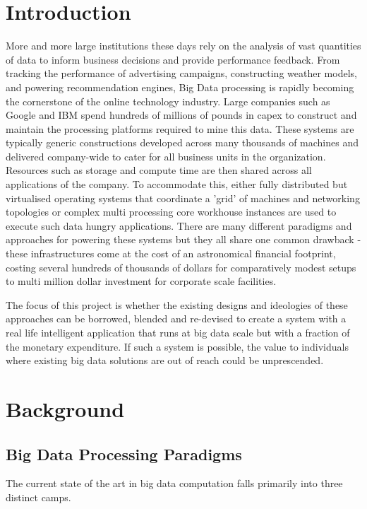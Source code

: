 \documentclass[a4paper,11pt]{scrreprt}
\begin{document}
\tableofcontents

\chapter{Introduction}
More and more large institutions these days rely on the analysis of vast quantities of data to inform business decisions and provide performance feedback. From tracking the performance of advertising campaigns, constructing weather models, and powering recommendation engines, Big Data processing is rapidly becoming the cornerstone of the online technology industry. Large companies such as Google and IBM spend hundreds of millions of pounds in capex to construct and maintain the processing platforms required to mine this data. These systems are typically generic constructions developed across many thousands of machines and delivered company-wide to cater for all business units in the organization. Resources such as storage and compute time are then shared across all applications of the company. To accommodate this, either fully distributed but virtualised operating systems that coordinate a 'grid' of machines and networking topologies or complex multi processing core workhouse instances are used to execute such data hungry applications. There are many different paradigms and approaches for powering these systems but they all share one common drawback - these infrastructures come at the cost of an astronomical financial footprint, costing several hundreds of thousands of dollars for comparatively modest setups to multi million dollar investment for corporate scale facilities.

The focus of this project is whether the existing designs and ideologies of these approaches can be borrowed, blended and re-devised to create a system with a real life intelligent application that runs at big data scale but with a fraction of the monetary expenditure. If such a system is possible, the value to individuals where existing big data solutions are out of reach could be unprescended.

\chapter{Background}
\section{Big Data Processing Paradigms}
The current state of the art in big data computation falls primarily into three distinct camps.
\end{document}
